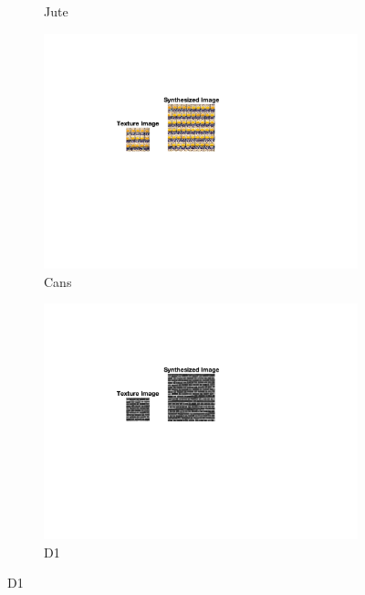 \documentclass[10pt,twocolumn,letterpaper]{article}
\begin{document}
\begin{figure}
\begin{subfigure}[h]{0.33\textwidth}
        \caption{Jute}
        \label{fig:jute_res}
    \end{subfigure}
    \hfill
    \begin{subfigure}[h]{0.33\textwidth}
        \centering
        \includegraphics[trim={4.5cm 7cm 8.0cm 3cm}, clip, scale=1.5, width=\textwidth]{../results/syn_final/result_cans_B_80.png}
        \caption{Cans}
        \label{fig:cans_res}
    \end{subfigure}
    \begin{subfigure}[h]{0.33\textwidth}
        \centering
        \includegraphics[trim={4.5cm 7cm 8.0cm 3cm}, clip, scale=1.5, width=\textwidth]{../results/syn_final/result_brick_bw_B_40.png}
        \caption{D1}
        \label{fig:d1_res}

\end{subfigure}
\end{figure}
\end{document}

